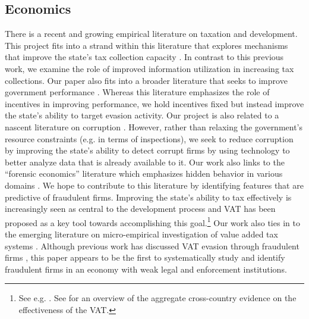\subsection{Economics}
\label{subsec:literature-economics}
There is a recent and growing empirical literature on taxation and development. This project fits into a strand within this literature
that explores mechanisms that improve the state's tax collection capacity \cite{khan2016tax}. In contrast to this previous work, we
examine the role of improved information utilization in increasing tax collections. Our paper also fits into a broader literature that seeks to improve government performance \cite{muralidharan2011teacher, glewwe2010teacher}. Whereas this literature emphasizes the role of incentives in improving performance, we hold incentives fixed but instead improve the state's ability to target evasion activity. Our project is also related to a nascent literature on corruption \cite{olken2012corruption, duflo2013truth}. However, rather than relaxing the government's resource constraints (e.g. in terms of inspections), we seek to reduce corruption by improving the state's ability to detect corrupt firms by using technology to better analyze data that is already available to it. Our work also links to the ``forensic economics'' literature which emphasizes hidden behavior in various domains \cite{zitzewitz2012forensic, jacob2003rotten, mironov2014corruption}. We hope to contribute to this literature by identifying features that are predictive of fraudulent firms. Improving the state's ability to tax effectively is increasingly seen as central to the development process and VAT has been proposed as a key tool towards accomplishing this goal.\footnote{See e.g. \cite{besley2013taxation}. See  \cite{Ebrilletal:2001} for an overview of the aggregate cross-country evidence on the effectiveness of the VAT.} Our work also ties in to the emerging literature on micro-empirical investigation of value added tax systems \cite{almunia2018under, mittal2017vat, naritomi2013consumers, pomeranz2015no}.  Although previous work has discussed VAT evasion through fraudulent firms \cite{keen2006vat, pashev2007countering}, this paper appears to be the first to systematically study and identify fraudulent firms in an economy with weak legal and enforcement institutions.

